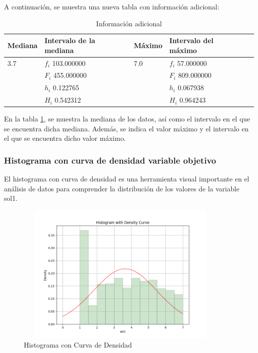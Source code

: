 A continuación, se muestra una nueva tabla con información adicional:

\begin{table}[H]
    \centering
    \caption{Información adicional}
    \begin{tabular}{lllll}
        \hline
        \textbf{Mediana} & \textbf{Intervalo de la mediana} & \textbf{Máximo} & \textbf{Intervalo del máximo} \\
        \hline
        3.7              & $f_i$ 103.000000                 & 7.0             & $f_i$ 57.000000               \\
                         & $F_i$ 455.000000                 &                 & $F_i$ 809.000000              \\
                         & $h_i$ 0.122765                   &                 & $h_i$ 0.067938                \\
                         & $H_i$ 0.542312                   &                 & $H_i$ 0.964243                \\
        \hline
    \end{tabular}%
    \label{tab:informacion_adicional}%
\end{table}%

En la tabla \ref{tab:informacion_adicional}, se muestra la mediana de los datos, así como el intervalo en el que se encuentra dicha mediana. Además, se indica el valor máximo y el intervalo en el que se encuentra dicho valor máximo.

\subsubsection{Histograma con curva de densidad variable objetivo}

El histograma con curva de densidad es una herramienta visual importante en el análisis de datos para comprender la distribución de los valores de la variable sol1.

\begin{figure}[H]
    \centering
    \includegraphics[width=4.06111in,height=2.68611in]{img/histogramaConCurvaDeDensidad.png}
    \caption{Histograma con Curva de Densidad}
    \label{fig:hist_density}%
\end{figure}%


